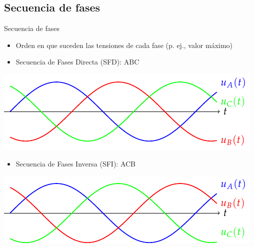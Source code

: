 \documentclass[aspectratio=169, xcolor={usenames,svgnames,dvipsnames}]{beamer}
\begin{document}
\subsection{Secuencia de fases}

\begin{frame}{Secuencia de fases}
\begin{itemize}
\item Orden en que suceden las tensiones de cada fase (p. ej., valor máximo)
\item Secuencia de Fases Directa (\alert{SFD}): ABC
\end{itemize}
\begin{center}
\includegraphics[height=0.3\textheight]{../figs/TensionesTrifasica_ABC.pdf}
\end{center}
\begin{itemize}
\item Secuencia de Fases Inversa (\alert{SFI}): ACB
\end{itemize}
\begin{center}
\includegraphics[height=0.3\textheight]{../figs/TensionesTrifasica_ACB.pdf}
\end{center}
\end{frame}
\end{document}
